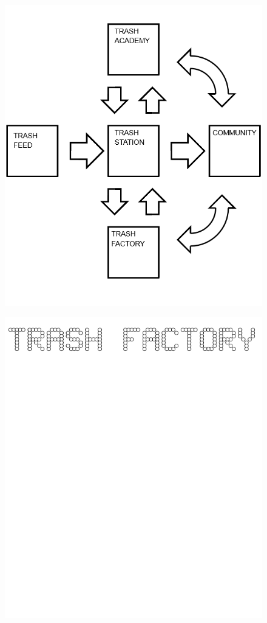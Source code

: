 \documentclass[17pt]{extreport}
\begin{document}
	\begin{figure}
		\centering
		\includegraphics[width=6.25in]{imageserver/uploadimages/trashgraph.png}
	\end{figure}
	\begin{figure}
		\centering
		\includegraphics[width=6.25in]{imageserver/uploadimages/trashfactory.png}
	\end{figure}
\end{document}
